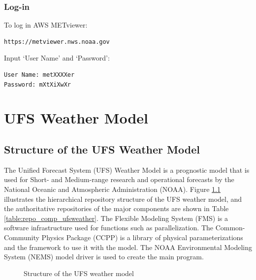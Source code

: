 \documentclass[11pt,fleqn]{report}              %
\begin{document}
\subsection{Log-in}
\label{subsec:aws_metviewer_login}

To log in AWS METviewer:
\lstset{language=bash}   
\begin{lstlisting}[frame=trBL]
https://metviewer.nws.noaa.gov
\end{lstlisting}

Input `User Name' and `Password':
\lstset{language=bash}   
\begin{lstlisting}[frame=trBL]
User Name: metXXXXer
Password: mXtXiXwXr
\end{lstlisting}







\chapter{UFS Weather Model}                 
\label{chpt:ufs_weather_model}

\section{Structure of the UFS Weather Model}
\label{sec:fv3_structure}

The Unified Forecast System (UFS) Weather Model is a prognostic model that is used for Short- and Medium-range research and operational forecasts by the National Oceanic and Atmospheric Administration (NOAA). Figure \ref{fig:ufs_weather_model_dir} illustrates the hierarchical repository structure of the UFS weather model, and the authoritative repositories of the major components are shown in Table \ref{table:repo_comp_ufsweather}. The Flexible Modeling System (FMS) is a software infrastructure used for functions such as parallelization. The Common-Community Physics Package (CCPP) is a library of physical parameterizations and the framework to use it with the model. The NOAA Environmental Modeling System (NEMS) model driver is used to create the main program.


\begin{figure}[ht!]
\centering
\begin{minipage}{0.65\linewidth}
\end{minipage}
\caption{Structure of the UFS weather model}
\label{fig:ufs_weather_model_dir}
\end{figure}
\end{document}
